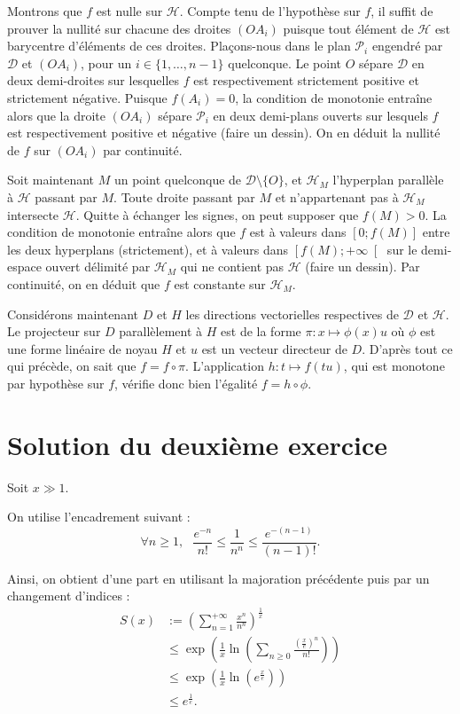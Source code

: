 Montrons que $f$ est nulle sur $\mathcal H$. Compte tenu de l'hypothèse sur $f$, il suffit de prouver la nullité sur chacune des droites $(OA_i)$ puisque tout élément de $\mathcal H$ est barycentre d'éléments de ces droites.
Plaçons-nous dans le plan $\mathcal P_i$ engendré par $\mathcal D$ et $(OA_i)$, pour un $i \in \{1,\dots,n-1\}$ quelconque.
Le point $O$ sépare $\mathcal D$ en deux demi-droites sur lesquelles $f$ est respectivement strictement positive et strictement négative.
Puisque $f(A_i) = 0$, la condition de monotonie entraîne alors que la droite $(OA_i)$ sépare $\mathcal P_i$ en deux demi-plans ouverts sur lesquels $f$ est respectivement positive et négative (faire un dessin).
On en déduit la nullité de $f$ sur $(OA_i)$ par continuité.

Soit maintenant $M$ un point quelconque de $\mathcal D\setminus \{O\}$, et $\mathcal H_M$ l'hyperplan parallèle à $\mathcal H$ passant par $M$.
Toute droite passant par $M$ et n'appartenant pas à $\mathcal H_M$ intersecte $\mathcal H$.
Quitte à échanger les signes, on peut supposer que $f(M) > 0$.
La condition de monotonie entraîne alors que $f$ est à valeurs dans $[0;f(M)]$ entre les deux hyperplans (strictement), et à valeurs dans $\left[f(M);+\infty\right[$ sur le demi-espace ouvert délimité par $\mathcal H_M$ qui ne contient pas $\mathcal H$ (faire un dessin). Par continuité, on en déduit que $f$ est constante sur $\mathcal H_M$.

Considérons maintenant $D$ et $H$ les directions vectorielles respectives de $\mathcal D$ et $\mathcal H$.
Le projecteur sur $D$ parallèlement à $H$ est de la forme $\pi : x \mapsto \phi(x)u$ où $\phi$ est une forme linéaire de noyau $H$ et $u$ est un vecteur directeur de $D$.
D'après tout ce qui précède, on sait que $f = f \circ \pi$.
L'application $h : t \mapsto f(tu)$, qui est monotone par hypothèse sur $f$, vérifie donc bien l'égalité $f = h \circ \phi$.

\section{Solution du deuxième exercice}

Soit $x\gg 1.$

On utilise l'encadrement suivant :
$$\forall n\geq 1, \mbox{ } \frac{e^{-n}}{n!}\leq \frac{1}{n^{n}}\leq \frac{e^{-(n-1)}}{(n-1)!}.$$

Ainsi, on obtient d'une part en utilisant la majoration précédente puis par un changement d'indices : 
\begin{align*}
S(x) & := \left(\sum_{n=1}^{+\infty}\frac{x^{n}}{n^{n}}\right)^{\frac{1}{x}}\\
& \leq \exp\left( \frac{1}{x}\ln\left( \sum_{n\geq 0}\frac{(\frac{x}{e})^{n}}{n!}\right)\right)\\
& \leq \exp\left( \frac{1}{x}\ln(e^{\frac{x}{e}})\right)\\
& \leq e^{\frac{1}{e}}.
\end{align*}

